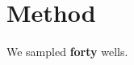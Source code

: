 \documentclass{article}
\begin{document}
\section{Method}
We sampled \textbf{forty} wells.
\end{document}
